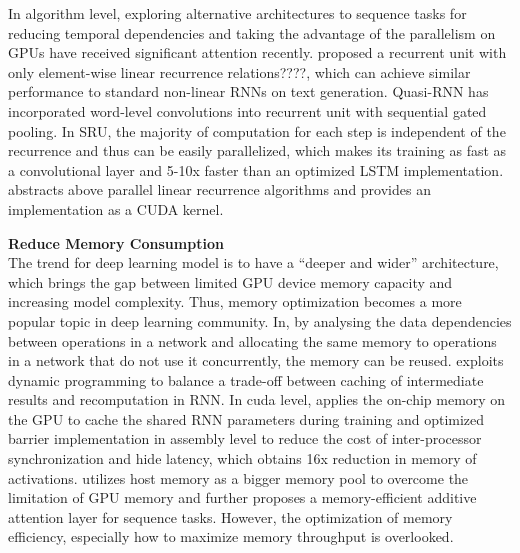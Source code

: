 \documentclass{article}
\begin{document}
In algorithm level, exploring alternative architectures to sequence tasks for reducing temporal dependencies and taking the advantage of the parallelism on GPUs have received significant attention recently\cite{chang2017dilated, kaiser2016can, kaiser2015neural, gehring2016convolutional, gehring2017convolutional, kalchbrenner2016neural}. 
\cite{Balduzzi:2016:SRN:3045390.3045527} proposed a recurrent unit with only element-wise linear recurrence relations????, which can achieve similar performance to standard non-linear RNNs on text generation.
\cite{bradbury2016quasi} Quasi-RNN has incorporated word-level convolutions into recurrent unit with sequential gated pooling. 
In SRU\cite{lei2017training}, the majority of computation for each step is independent of the recurrence and thus can be easily parallelized, which makes its training as fast as a convolutional layer and 5-10x faster than an optimized LSTM implementation. 
\cite{martin2017parallelizing}abstracts above parallel linear recurrence algorithms and provides an implementation as a CUDA kernel.






\textbf{Reduce Memory Consumption} \\
 The trend for deep learning model is to have a “deeper and wider” architecture, which brings the gap between limited GPU device memory capacity and increasing model complexity. Thus, memory optimization becomes a more popular topic in deep learning community. In\cite{chen2015mxnet}, by analysing the data dependencies between operations in a network and allocating the same memory to operations in a network that do not use it concurrently, the memory can be reused.  \cite{gruslys2016memory} exploits dynamic programming to balance a trade-off between caching of intermediate results and recomputation in RNN. In cuda level, \cite{diamos2016persistent} applies the on-chip memory on the GPU to cache the shared RNN parameters during training and optimized barrier implementation in assembly level to reduce the cost of inter-processor synchronization and hide latency, which obtains 16x reduction in memory of activations. \cite{mengtraining} utilizes host memory as a bigger memory pool to overcome the limitation of GPU memory and further proposes a memory-efficient additive attention layer\cite{bahdanau2014neural} for sequence tasks. However, the optimization of memory efficiency, especially how to maximize memory throughput is overlooked. 
\end{document}
